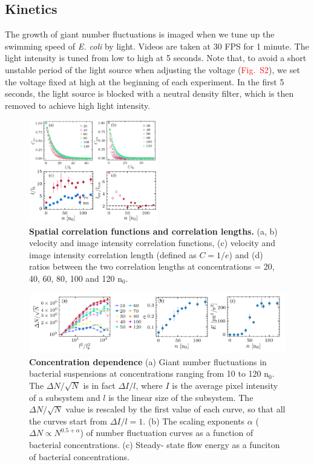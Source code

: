 \documentclass[twocolumn,aps,pre,amsmath,amssymb,floatfix,longbibliography]{revtex4-1}
\begin{document}
\subsection{Kinetics}
The growth of giant number fluctuations is imaged when we tune up the swimming speed of \textit{E. coli} by light. Videos are taken at 30 FPS for 1 minute. The light intensity is tuned from low to high at 5 seconds. Note that, to avoid a short unstable period of the light source when adjusting the voltage (\textcolor{red}{Fig.~S2}), we set the voltage fixed at high at the beginning of each experiment. In the first 5 seconds, the light source is blocked with a neutral density filter, which is then removed to achieve high light intensity.

\begin{figure}[!]
\begin{center}
\includegraphics[width=0.5\textwidth]{GNF_figure-2-v2.PNG}
\caption[]{\textbf{Spatial correlation functions and correlation lengths.} (a, b) velocity and image intensity correlation functions, (c) velocity and image intensity correlation length (defined as $C=1/e$) and (d) ratios between the two correlation lengths at concentrations = 20, 40, 60, 80, 100 and 120 n$_0$.}
\label{fig:2}
\end{center}
\end{figure}


\begin{figure}[!]
\begin{center}
\includegraphics[width=\textwidth]{GNF-figures-3-v3.png}
\caption[]{\textbf{Concentration dependence} (a) Giant number fluctuations in bacterial suspensions at concentrations ranging from 10 to 120 n$_0$. The $\Delta N/\sqrt{N}$ is in fact $\Delta I/l$, where $I$ is the average pixel intensity of a subsystem and $l$ is the linear size of the subsystem. The $\Delta N/\sqrt{N}$ value is rescaled by the first value of each curve, so that all the curves start from $\Delta I/l=1$. (b) The scaling exponents $\alpha$ ($\Delta N \propto N^{0.5+\alpha}$) of number fluctuation curves as a function of bacterial concentrations. (c) Steady- state flow energy as a funciton of bacterial concentrations.}
\label{fig:3}
\end{center}
\end{figure}
\end{document}
